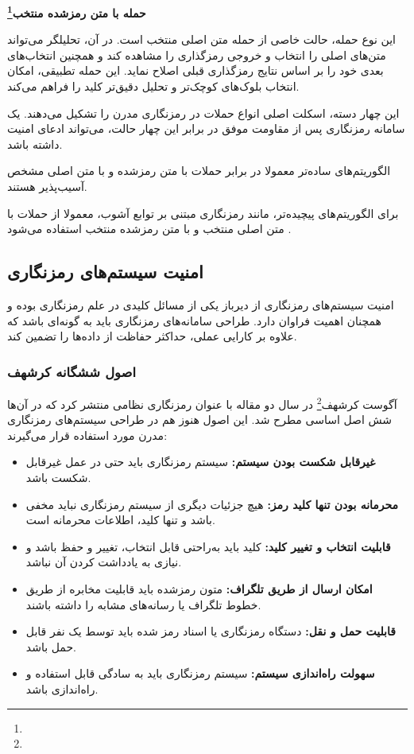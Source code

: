 \textbf{حمله با متن رمزشده منتخب\footnote{}}

این نوع حمله، حالت خاصی از حمله متن اصلی منتخب است. در آن، تحلیلگر می‌تواند متن‌های اصلی را انتخاب و خروجی رمزگذاری را مشاهده کند و همچنین انتخاب‌های بعدی خود را بر اساس نتایج رمزگذاری قبلی اصلاح نماید. این حمله تطبیقی، امکان انتخاب بلوک‌های کوچک‌تر و تحلیل دقیق‌تر کلید را فراهم می‌کند.

این چهار دسته، اسکلت اصلی انواع حملات در رمزنگاری مدرن را تشکیل می‌دهند. یک سامانه رمزنگاری پس از مقاومت موفق در برابر این چهار حالت، می‌تواند ادعای امنیت داشته باشد.

الگوریتم‌های ساده‌تر معمولا در برابر حملات با متن رمزشده و با متن اصلی مشخص آسیب‌پذیر هستند.

برای الگوریتم‌های پیچیده‌تر، مانند رمزنگاری مبتنی بر توابع آشوب، معمولا از حملات با متن اصلی منتخب و با متن رمزشده منتخب استفاده می‌شود \cite{ref35}.

\subsection{امنیت سیستم‌های رمزنگاری}

امنیت سیستم‌های رمزنگاری از دیرباز یکی از مسائل کلیدی در علم رمزنگاری بوده و همچنان اهمیت فراوان دارد. طراحی سامانه‌های رمزنگاری باید به گونه‌ای باشد که علاوه بر کارایی عملی، حداکثر حفاظت از داده‌ها را تضمین کند.

\subsubsection{اصول ششگانه کرشهف}

آگوست کرشهف\footnote{} در سال  دو مقاله با عنوان رمزنگاری نظامی منتشر کرد که در آن‌ها شش اصل اساسی مطرح شد. این اصول هنوز هم در طراحی سیستم‌های رمزنگاری مدرن مورد استفاده قرار می‌گیرند:

\begin{itemize}
    \item \textbf{غیرقابل شکست بودن سیستم:} سیستم رمزنگاری باید حتی در عمل غیرقابل شکست باشد.
    \item \textbf{محرمانه بودن تنها کلید رمز:} هیچ جزئیات دیگری از سیستم رمزنگاری نباید مخفی باشد و تنها کلید، اطلاعات محرمانه است.
    \item \textbf{قابلیت انتخاب و تغییر کلید:} کلید باید به‌راحتی قابل انتخاب، تغییر و حفظ باشد و نیازی به یادداشت کردن آن نباشد.
    \item \textbf{امکان ارسال از طریق تلگراف:} متون رمزشده باید قابلیت مخابره از طریق خطوط تلگراف یا رسانه‌های مشابه را داشته باشند.
    \item \textbf{قابلیت حمل و نقل:} دستگاه رمزنگاری یا اسناد رمز شده باید توسط یک نفر قابل حمل باشد.
    \item \textbf{سهولت راه‌اندازی سیستم:} سیستم رمزنگاری باید به سادگی قابل استفاده و راه‌اندازی باشد.
\end{itemize}


